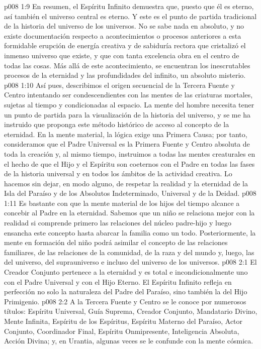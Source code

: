 \vs p008 1:9 En resumen, el Espíritu Infinito demuestra que, puesto que él es eterno, así también el universo central es eterno. Y este es el punto de partida tradicional de la historia del universo de los universos. No se sabe nada en absoluto, y no existe documentación respecto a acontecimientos o procesos anteriores a esta formidable erupción de energía creativa y de sabiduría rectora que cristalizó el inmenso universo que existe, y que con tanta excelencia obra en el centro de todas las cosas. Más allá de este acontecimiento, se encuentran los inescrutables procesos de la eternidad y las profundidades del infinito, un absoluto misterio.
\vs p008 1:10 \pc Así pues, describimos el origen secuencial de la Tercera Fuente y Centro intentando ser condescendientes con las mentes de las criaturas mortales, sujetas al tiempo y condicionadas al espacio. La mente del hombre necesita tener un punto de partida para la visualización de la historia del universo, y se me ha instruido que proponga este método histórico de acceso al concepto de la eternidad. En la mente material, la lógica exige una Primera Causa; por tanto, consideramos que el Padre Universal es la Primera Fuente y Centro absoluta de toda la creación y, al mismo tiempo, instruimos a todas las mentes creaturales en el hecho de que el Hijo y el Espíritu son coeternos con el Padre en todas las fases de la historia universal y en todos los ámbitos de la actividad creativa. Lo hacemos sin dejar, en modo alguno, de respetar la realidad y la eternidad de la Isla del Paraíso y de los Absolutos Indeterminado, Universal y de la Deidad.
\vs p008 1:11 Es bastante con que la mente material de los hijos del tiempo alcance a concebir al Padre en la eternidad. Sabemos que un niño se relaciona mejor con la realidad si comprende primero las relaciones del núcleo padre\hyp{}hijo y luego ensancha este concepto hasta abarcar la familia como un todo. Posteriormente, la mente en formación del niño podrá asimilar el concepto de las relaciones familiares, de las relaciones de la comunidad, de la raza y del mundo y, luego, las del universo, del suprauniverso e incluso del universo de los universos.
\vs p008 2:1 El Creador Conjunto pertenece a la eternidad y es total e incondicionalmente uno con el Padre Universal y con el Hijo Eterno. El Espíritu Infinito refleja en perfección no solo la naturaleza del Padre del Paraíso, sino también la del Hijo Primigenio.
\vs p008 2:2 \pc A la Tercera Fuente y Centro se le conoce por numerosos títulos: Espíritu Universal, Guía Suprema, Creador Conjunto, Mandatario Divino, Mente Infinita, Espíritu de los Espíritus, Espíritu Materno del Paraíso, Actor Conjunto, Coordinador Final, Espíritu Onmipresente, Inteligencia Absoluta, Acción Divina; y, en Urantia, algunas veces se le confunde con la mente cósmica.
